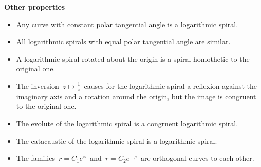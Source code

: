 \documentclass[12pt]{article}
\theoremstyle{definition}
\begin{document}
\textbf{Other properties}
\begin{itemize}
\item Any curve with constant polar tangential angle is a logarithmic spiral.
\item All logarithmic spirals with equal polar tangential angle are similar.
\item A logarithmic spiral rotated about the origin is a spiral homothetic to the original one.
\item The inversion \,$z \mapsto \frac{1}{z}$\, causes for the logarithmic spiral a reflexion against the imaginary axis and a rotation around the origin, but the image is congruent to the original one.
\item The evolute of the logarithmic spiral is a congruent logarithmic spiral.
\item The catacaustic of the logarithmic spiral is a logarithmic spiral.
\item The families \,$r = C_1e^{\varphi}$\, and \,$r = C_2e^{-\varphi}$\, are orthogonal curves to each other.
\end{itemize}

\end{document}

